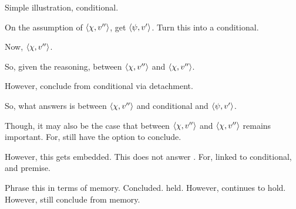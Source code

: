 \begin{note}
  Simple illustration, conditional.

  On the assumption of \(\langle \chi, v'' \rangle\), get \(\langle \psi, v' \rangle\).
  Turn this into a conditional.

  Now, \(\langle \chi, v'' \rangle\).

  So, given the reasoning, \support{} between \(\langle \chi, v'' \rangle\) and \(\langle \chi, v'' \rangle\).

  However, conclude from conditional via detachment.

  So, what answers \qWhyV{} is \support{} between \(\langle \chi, v'' \rangle\) and conditional and \(\langle \psi, v' \rangle\).

  Though, it may also be the case that \support{} between \(\langle \chi, v'' \rangle\) and \(\langle \chi, v'' \rangle\) remains important.
  For, still have the option to conclude.

  However, this gets embedded.
  This \support{} does not answer \qWhyV{}.
  For, linked to conditional, and premise.
\end{note}

\begin{note}
  Phrase this in terms of memory.
  Concluded.
   held.
  However, \support{} continues to hold.
  However, still conclude from memory.
\end{note}

\subparagraph{\citeauthor{Owens:2006tw}}

